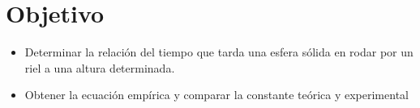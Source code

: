 \section{Objetivo}
\begin{itemize}
    \item Determinar la relación del tiempo que tarda una esfera sólida en rodar por un riel a una altura determinada.
    \item Obtener la ecuación empírica y comparar la constante teórica y experimental
\end{itemize}